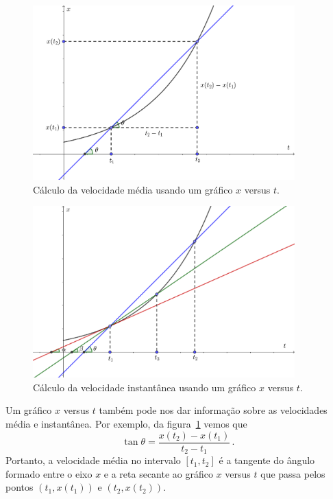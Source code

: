\documentclass[12pt, a4paper]{article}
\begin{document}
\begin{figure}[t]
  \centering
  \includegraphics[width=0.9\textwidth,keepaspectratio]{2-movimento-retilineo-fig2.pdf}
  \caption{Cálculo da velocidade média usando um gráfico $x$ versus $t$.}
  \label{fig2}
\end{figure}

\begin{figure}[t]
  \centering
  \includegraphics[width=0.9\textwidth,keepaspectratio]{2-movimento-retilineo-fig3.pdf}
  \caption{Cálculo da velocidade instantânea usando um gráfico $x$ versus $t$.}
  \label{fig3}
\end{figure}


Um gráfico $x$ versus $t$ também pode nos dar informação sobre as velocidades média e instantânea. Por exemplo, da figura~\ref{fig2} vemos que
$$\tan\theta=\frac{x(t_2)-x(t_1)}{t_2-t_1}\,.$$
Portanto, a velocidade média no intervalo $[t_1,t_2]$ é a tangente do ângulo formado entre o eixo $x$ e a reta secante ao gráfico $x$ versus $t$ que passa pelos pontos $(t_1,x(t_1))$ e $(t_2,x(t_2))$.
\end{document}
